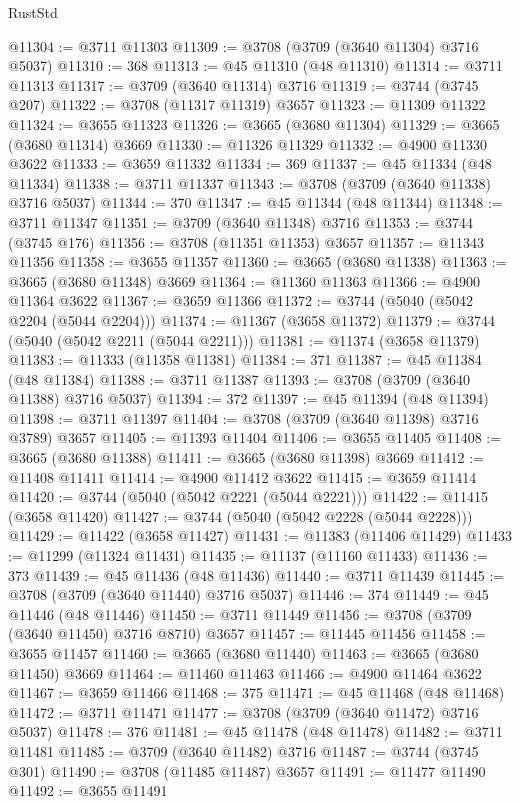 \begin{lexlean}{RustStd}
\begin{coremodule}
@11304 := @3711 @11303
@11309 := @3708 (@3709 (@3640 @11304) @3716 @5037)
@11310 := 368
@11313 := @45 @11310 (@48 @11310)
@11314 := @3711 @11313
@11317 := @3709 (@3640 @11314) @3716
@11319 := @3744 (@3745 @207)
@11322 := @3708 (@11317 @11319) @3657
@11323 := @11309 @11322
@11324 := @3655 @11323
@11326 := @3665 (@3680 @11304)
@11329 := @3665 (@3680 @11314) @3669
@11330 := @11326 @11329
@11332 := @4900 @11330 @3622
@11333 := @3659 @11332
@11334 := 369
@11337 := @45 @11334 (@48 @11334)
@11338 := @3711 @11337
@11343 := @3708 (@3709 (@3640 @11338) @3716 @5037)
@11344 := 370
@11347 := @45 @11344 (@48 @11344)
@11348 := @3711 @11347
@11351 := @3709 (@3640 @11348) @3716
@11353 := @3744 (@3745 @176)
@11356 := @3708 (@11351 @11353) @3657
@11357 := @11343 @11356
@11358 := @3655 @11357
@11360 := @3665 (@3680 @11338)
@11363 := @3665 (@3680 @11348) @3669
@11364 := @11360 @11363
@11366 := @4900 @11364 @3622
@11367 := @3659 @11366
@11372 := @3744 (@5040 (@5042 @2204 (@5044 @2204)))
@11374 := @11367 (@3658 @11372)
@11379 := @3744 (@5040 (@5042 @2211 (@5044 @2211)))
@11381 := @11374 (@3658 @11379)
@11383 := @11333 (@11358 @11381)
@11384 := 371
@11387 := @45 @11384 (@48 @11384)
@11388 := @3711 @11387
@11393 := @3708 (@3709 (@3640 @11388) @3716 @5037)
@11394 := 372
@11397 := @45 @11394 (@48 @11394)
@11398 := @3711 @11397
@11404 := @3708 (@3709 (@3640 @11398) @3716 @3789) @3657
@11405 := @11393 @11404
@11406 := @3655 @11405
@11408 := @3665 (@3680 @11388)
@11411 := @3665 (@3680 @11398) @3669
@11412 := @11408 @11411
@11414 := @4900 @11412 @3622
@11415 := @3659 @11414
@11420 := @3744 (@5040 (@5042 @2221 (@5044 @2221)))
@11422 := @11415 (@3658 @11420)
@11427 := @3744 (@5040 (@5042 @2228 (@5044 @2228)))
@11429 := @11422 (@3658 @11427)
@11431 := @11383 (@11406 @11429)
@11433 := @11299 (@11324 @11431)
@11435 := @11137 (@11160 @11433)
@11436 := 373
@11439 := @45 @11436 (@48 @11436)
@11440 := @3711 @11439
@11445 := @3708 (@3709 (@3640 @11440) @3716 @5037)
@11446 := 374
@11449 := @45 @11446 (@48 @11446)
@11450 := @3711 @11449
@11456 := @3708 (@3709 (@3640 @11450) @3716 @8710) @3657
@11457 := @11445 @11456
@11458 := @3655 @11457
@11460 := @3665 (@3680 @11440)
@11463 := @3665 (@3680 @11450) @3669
@11464 := @11460 @11463
@11466 := @4900 @11464 @3622
@11467 := @3659 @11466
@11468 := 375
@11471 := @45 @11468 (@48 @11468)
@11472 := @3711 @11471
@11477 := @3708 (@3709 (@3640 @11472) @3716 @5037)
@11478 := 376
@11481 := @45 @11478 (@48 @11478)
@11482 := @3711 @11481
@11485 := @3709 (@3640 @11482) @3716
@11487 := @3744 (@3745 @301)
@11490 := @3708 (@11485 @11487) @3657
@11491 := @11477 @11490
@11492 := @3655 @11491

\end{coremodule}
\end{lexlean}
